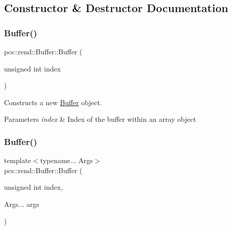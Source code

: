 \subsection{Constructor \& Destructor Documentation}
\mbox{\label{classpcs_1_1rend_1_1Buffer_add9c4196c80605e47170fa37ad7eef50}} 
\subsubsection{\texorpdfstring{Buffer()}{Buffer()}\hspace{0.1cm}{\footnotesize\ttfamily [1/2]}}
{\footnotesize\ttfamily pcs\+::rend\+::\+Buffer\+::\+Buffer (\begin{DoxyParamCaption}\item[{unsigned int}]{index }\end{DoxyParamCaption})}



Constructs a new \hyperlink{classpcs_1_1rend_1_1Buffer}{Buffer} object. 


\begin{DoxyParams}{Parameters}
{\em index} & Index of the buffer within an array object \\
\hline
\end{DoxyParams}
\mbox{\label{classpcs_1_1rend_1_1Buffer_a4ac6db7b29dd6a33d1f65b0c491a033f}} 
\subsubsection{\texorpdfstring{Buffer()}{Buffer()}\hspace{0.1cm}{\footnotesize\ttfamily [2/2]}}
{\footnotesize\ttfamily template$<$typename... Args$>$ \\
pcs\+::rend\+::\+Buffer\+::\+Buffer (\begin{DoxyParamCaption}\item[{unsigned int}]{index,  }\item[{Args...}]{args }\end{DoxyParamCaption})\hspace{0.3cm}{\ttfamily [inline]}}



